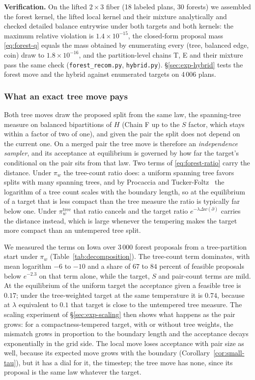 \documentclass[11pt]{article}
\begin{document}
\textbf{Verification.} On the lifted $2 \times 3$ fiber (18 labeled
plans, 30 forests) we assembled the forest kernel, the lifted local
kernel and their mixture analytically and checked detailed balance
entrywise under both targets and both kernels: the maximum relative
violation is $1.4 \times 10^{-15}$, the closed-form proposal mass
\eqref{eq:forest-q} equals the mass obtained by enumerating every
(tree, balanced edge, coin) draw to $1.8 \times 10^{-16}$, and the
partition-level chains T, E and their mixture pass the same check
(\texttt{forest\_recom.py}, \texttt{hybrid.py}).
\S\ref{sec:exp-hybrid} tests the forest move and the hybrid against
enumerated targets on 4\,006 plans.

\subsubsection{What an exact tree move pays}\label{sec:tree-pays}

Both tree moves draw the proposed split from the same law, the
spanning-tree measure on balanced bipartitions of $H$ (Chain F up to
the $S$ factor, which stays within a factor of two of one), and given
the pair the split does not depend on the current one. On a merged
pair the tree move is therefore an \emph{independence sampler}, and
its acceptance at equilibrium is governed by how far the target's
conditional on the pair sits from that law. Two terms of \eqref{eq:forest-ratio} carry the distance.
Under $\pi_w$ the tree-count ratio does: a uniform spanning tree
favors splits with many spanning trees, and by Procaccia and
Tucker-Foltz~\cite{procaccia2022compact} the logarithm of a tree
count scales with the boundary length, so at the equilibrium of a
target that is less compact than the tree measure the ratio is
typically far below one. Under $\pi_w^{\mathrm{tree}}$ that ratio
cancels and the target ratio $e^{-\lambda \Delta w(\partial)}$
carries the distance instead, which is large whenever the tempering
makes the target more compact than an untempered tree split.

We measured the terms on Iowa over 3\,000 forest proposals from a
tree-partition start under $\pi_w$ (Table~\ref{tab:decomposition}).
The tree-count term dominates, with mean logarithm $-6$ to $-10$ and
a share of $67$ to $84$ percent of feasible proposals below $e^{-2.3}$
on that term alone, while the target, $S$ and pair-count terms are
mild. At the equilibrium of the uniform target the acceptance given a
feasible tree is $0.17$; under the tree-weighted target at the same
temperature it is $0.74$, because at $\lambda$ equivalent to $0.1$
that target is close to the untempered tree measure. The scaling
experiment of \S\ref{sec:exp-scaling} then shows what happens as the
pair grows: for a compactness-tempered target, with or without tree
weights, the mismatch grows in proportion to the boundary length and
the acceptance decays exponentially in the grid side. The local move
loses acceptance with pair size as well, because its expected move
grows with the boundary (Corollary~\ref{cor:small-tau}), but it has a
dial for it, the timestep; the tree move has none, since its proposal
is the same law whatever the target.
\end{document}
